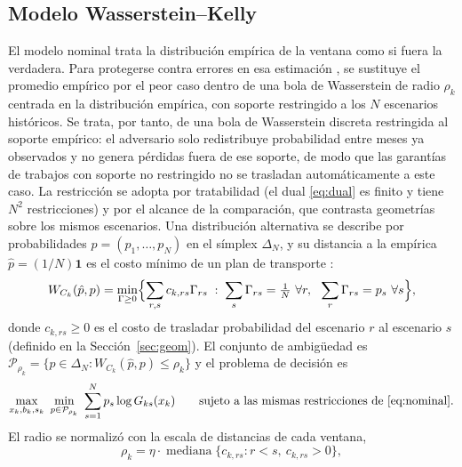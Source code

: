 \subsection{Modelo Wasserstein--Kelly}\label{sec:wk}

El modelo nominal trata la distribución empírica de la ventana como si fuera la verdadera. Para protegerse contra errores en esa estimación \citep{li2023,sunboyd2018,hsiehyu2024}, se sustituye el promedio empírico por el peor caso dentro de una bola de Wasserstein de radio $\rho_k$ centrada en la distribución empírica, 
con soporte restringido a los $N$ escenarios históricos. Se trata, por tanto, de una bola de Wasserstein discreta restringida al soporte empírico: el adversario solo redistribuye probabilidad entre meses ya observados y no genera pérdidas fuera de ese soporte, de modo que las garantías de trabajos con soporte no restringido no se trasladan automáticamente a este caso. La restricción se adopta por tratabilidad (el dual \eqref{eq:dual} es finito y tiene $N^2$ restricciones) y por el alcance de la comparación, que contrasta geometrías sobre los mismos escenarios.
 Una distribución alternativa se describe por probabilidades $p=(p_1,\dots,p_N)$ en el símplex $\Delta_N$, y su distancia a la empírica $\hat p=(1/N)\mathbf 1$ es el costo mínimo de un plan de transporte \citep{mohajerin2018,kuhn2019}:
\begin{equation}\label{eq:W}
W_{C_k}(\hat p,p)=\min_{\Gamma\ge0}\Bigl\{\sum_{r,s}c_{k,rs}\Gamma_{rs}\;:\;\sum_{s}\Gamma_{rs}=\tfrac1N\ \forall r,\ \ \sum_{r}\Gamma_{rs}=p_s\ \forall s\Bigr\},
\end{equation}
donde $c_{k,rs}\ge0$ es el costo de trasladar probabilidad del escenario $r$ al escenario $s$ (definido en la Sección~\ref{sec:geom}). El conjunto de ambigüedad es $\mathcal P_{\rho_k}=\{p\in\Delta_N: W_{C_k}(\hat p,p)\le\rho_k\}$ y el problema de decisión es
\begin{equation}\label{eq:minimax}
\max_{x_k,b_k,s_k}\ \min_{p\in\mathcal P_{\rho_k}}\ \sum_{s=1}^N p_s\log G_{ks}(x_k)\qquad\text{sujeto a las mismas restricciones de \eqref{eq:nominal}}.
\end{equation}
El radio se normalizó con la escala de distancias de cada ventana,
\begin{equation}\label{eq:rho}
\rho_k=\eta\cdot\operatorname{mediana}\{c_{k,rs}: r<s,\ c_{k,rs}>0\},
\end{equation}

